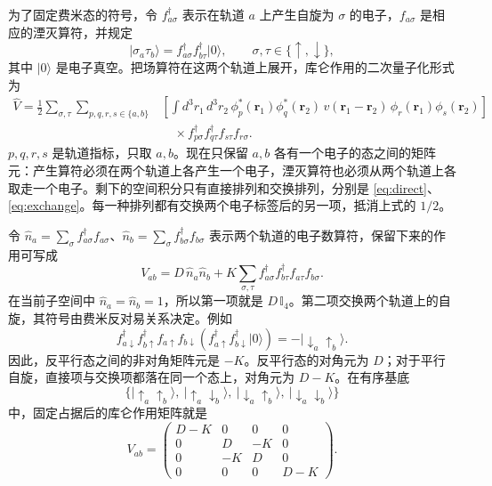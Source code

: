 \documentclass[UTF8,11pt,a4paper,fontset=fandol]{ctexart}
\newcommand{\ket}[1]{\lvert #1\rangle}
\newcommand{\id}{\mathbb I}
\begin{document}
为了固定费米态的符号，令 $f^\dagger_{a\sigma}$ 表示在轨道 $a$ 上产生自旋为 $\sigma$ 的电子，$f_{a\sigma}$ 是相应的湮灭算符，并规定
\begin{equation}
\ket{\sigma_a\tau_b}
=f^\dagger_{a\sigma}f^\dagger_{b\tau}\ket{0},
\qquad \sigma,\tau\in\{\uparrow,\downarrow\},
\end{equation}
其中 $\ket{0}$ 是电子真空。把场算符在这两个轨道上展开，库仑作用的二次量子化形式为
\begin{equation}
\begin{aligned}
\hat V=\frac12\sum_{\sigma,\tau}\sum_{p,q,r,s\in\{a,b\}}
&\left[\int d^3r_1\,d^3r_2\,
\phi_p^*(\mathbf r_1)\phi_q^*(\mathbf r_2)\,
v(\mathbf r_1-\mathbf r_2)\,
\phi_r(\mathbf r_1)\phi_s(\mathbf r_2)\right]\\
&\hspace{1em}\times
f^\dagger_{p\sigma}f^\dagger_{q\tau}f_{s\tau}f_{r\sigma}.
\end{aligned}
\end{equation}
$p,q,r,s$ 是轨道指标，只取 $a,b$。现在只保留 $a,b$ 各有一个电子的态之间的矩阵元：产生算符必须在两个轨道上各产生一个电子，湮灭算符也必须从两个轨道上各取走一个电子。剩下的空间积分只有直接排列和交换排列，分别是 \eqref{eq:direct}、\eqref{eq:exchange}。每一种排列都有交换两个电子标签后的另一项，抵消上式的 $1/2$。

令 $\hat n_a=\sum_\sigma f^\dagger_{a\sigma}f_{a\sigma}$、$\hat n_b=\sum_\sigma f^\dagger_{b\sigma}f_{b\sigma}$ 表示两个轨道的电子数算符，保留下来的作用可写成
\begin{equation}
V_{ab}=D\,\hat n_a\hat n_b+
K\sum_{\sigma,\tau}
f^\dagger_{a\sigma}f^\dagger_{b\tau}f_{a\tau}f_{b\sigma}.
\label{eq:projectedCoulomb}
\end{equation}
在当前子空间中 $\hat n_a=\hat n_b=1$，所以第一项就是 $D\,\id_4$。第二项交换两个轨道上的自旋，其符号由费米反对易关系决定。例如
\begin{equation}
f^\dagger_{a\downarrow}f^\dagger_{b\uparrow}
f_{a\uparrow}f_{b\downarrow}
\left(f^\dagger_{a\uparrow}f^\dagger_{b\downarrow}\ket{0}\right)
=-\ket{\downarrow_a\uparrow_b}.
\end{equation}
因此，反平行态之间的非对角矩阵元是 $-K$。反平行态的对角元为 $D$；对于平行自旋，直接项与交换项都落在同一个态上，对角元为 $D-K$。在有序基底
\begin{equation}
\bigl\{
\ket{\uparrow_a\uparrow_b},\
\ket{\uparrow_a\downarrow_b},\
\ket{\downarrow_a\uparrow_b},\
\ket{\downarrow_a\downarrow_b}
\bigr\}
\label{eq:pairbasis}
\end{equation}
中，固定占据后的库仑作用矩阵就是
\begin{equation}
V_{ab}=
\begin{pmatrix}
D-K&0&0&0\\
0&D&-K&0\\
0&-K&D&0\\
0&0&0&D-K
\end{pmatrix}.
\label{eq:coulombmatrix}
\end{equation}
\end{document}

